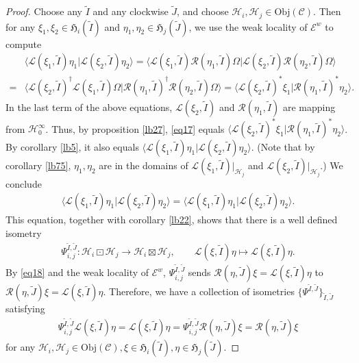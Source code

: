 \documentclass[12pt,a4paper]{article}
\theoremstyle{definition}
\theoremstyle{plain}
\newcommand{\fk}{\mathfrak}
\newcommand{\mc}{\mathcal}
\newcommand{\wtd}{\widetilde}
\newcommand{\bk}[1]{\langle {#1}\rangle}
\newcommand{\scr}{\mathscr}
\newcommand{\Obj}{\mathrm{Obj}}
\numberwithin{equation}{subsection}
\begin{document}
\begin{proof}


Choose any $\wtd I$ and any clockwise $\wtd J$, and choose $\mc H_i,\mc H_j\in\Obj(\scr C)$. Then for any $\xi_1,\xi_2\in\fk H_i(\wtd I)$ and $\eta_1,\eta_2\in\fk H_j(\wtd J)$, we use the weak locality of $\scr E^w$ to compute
\begin{align}
&\bk{\mc L(\xi_1,\wtd I)\eta_1|\mc L(\xi_2,\wtd I)\eta_2}=\bk{\mc L(\xi_1,\wtd I)\mc R(\eta_1,\wtd I)\Omega|\mc L(\xi_2,\wtd I)\mc R(\eta_2,\wtd I)\Omega}\nonumber\\
=&\bk{\mc L(\xi_2,\wtd I)^\dagger\mc L(\xi_1,\wtd I)\Omega|\mc R(\eta_1,\wtd I)^\dagger\mc R(\eta_2,\wtd I)\Omega}=\bk{\mc L(\xi_2,\wtd I)^*\xi_1|\mc R(\eta_1,\wtd I)^*\eta_2}.\label{eq17}
\end{align}
In the last term of the above equations, $\mc L(\xi_2,\wtd I)$ and $\mc R(\eta_1,\wtd I)$ are mapping from $\mc H_0^\infty$. Thus, by proposition \ref{lb27},  \eqref{eq17} equals $\bk{\scr L(\xi_2,\wtd I)^*\xi_1|\scr R(\eta_1,\wtd I)^*\eta_2}$. By corollary \ref{lb5}, it also equals $\bk{\scr L(\xi_1,\wtd I)\eta_1|\scr L(\xi_2,\wtd I)\eta_2}$. (Note that by corollary \ref{lb75}, $\eta_1,\eta_2$ are in the domains of $\scr L(\xi_1,\wtd I)|_{\mc H_j}$ and $\scr L(\xi_2,\wtd I)|_{\mc H_j}$.) We conclude
\begin{align*}
\bk{\mc L(\xi_1,\wtd I)\eta_1|\mc L(\xi_2,\wtd I)\eta_2}=\bk{\scr L(\xi_1,\wtd I)\eta_1|\scr L(\xi_2,\wtd I)\eta_2}.
\end{align*}
This equation, together with corollary \ref{lb22}, shows that there is a well defined isometry
\begin{gather*}
\Psi_{i,j}^{\wtd I,\wtd J}:\mc H_i\boxdot\mc H_j\rightarrow\mc H_i\boxtimes\mc H_j,\qquad \mc L(\xi,\wtd I)\eta\mapsto\scr L(\xi,\wtd I)\eta.
\end{gather*}
By \eqref{eq18} and the weak locality of $\scr E^w$, $\Psi_{i,j}^{\wtd I,\wtd J}$ sends $\mc R(\eta,\wtd J)\xi=\mc L(\xi,\wtd I)\eta$ to $\scr R(\eta,\wtd J)\xi=\scr L(\xi,\wtd I)\eta$. Therefore, we have a collection of isometries $\{\Psi^{\wtd I,\wtd J}\}_{\wtd I,\wtd J}$ satisfying \begin{gather*}
\Psi_{i,j}^{\wtd I,\wtd J}\mc L(\xi,\wtd I)\eta=\scr L(\xi,\wtd I)\eta=\Psi_{i,j}^{\wtd I,\wtd J}\mc R(\eta,\wtd J)\xi=\scr R(\eta,\wtd J)\xi
\end{gather*}
for any $\mc H_i,\mc H_j\in\Obj(\scr C),\xi\in\fk H_i(\wtd I),\eta\in\fk H_j(\wtd J)$.


\end{proof}
\end{document}
